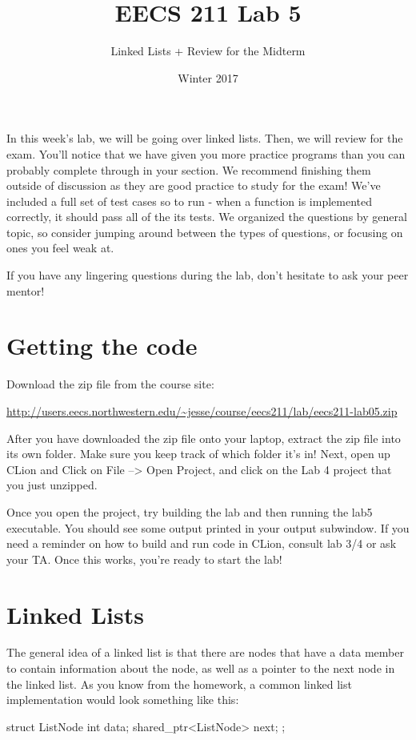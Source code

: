 \documentclass{tufte-handout}
\title{EECS 211 Lab 5}
\author{Linked Lists + Review for the Midterm}
\date{Winter 2017}
\begin{document}
\maketitle

In this week's lab, we will be going over linked lists. Then, we will review for the exam.
You'll notice that we have given you more practice programs than you can probably complete through in your section. We recommend finishing them outside of discussion as they are good practice to study for the exam! 
We've included a full set of test cases so to run - when a function is implemented correctly, it should pass all of the its tests.
We organized the questions by general topic, so consider jumping around between the types of questions, or focusing on ones you feel weak at.

If you have any lingering questions during the lab, don't hesitate to ask your peer mentor!
\section{Getting the code}
Download the zip file from the course site: \medskip

\url{http://users.eecs.northwestern.edu/~jesse/course/eecs211/lab/eecs211-lab05.zip}

\medskip \noindent
After you have downloaded the zip file onto your laptop, extract the zip file into its own folder. Make sure you keep track of which folder it's in!  Next, open up CLion and Click on File --> Open Project, and click on the Lab 4 project that you just unzipped. 

Once you open the project, try building the lab and then running the lab5 executable. 
You should see some output printed in your output subwindow.
If you need a reminder on how to build and run code in CLion, consult lab 3/4 or ask your TA.
Once this works, you're ready to start the lab!

\section{Linked Lists}
The general idea of a linked list is that there are nodes that have a data member to contain information about the node, as well as a pointer to the next node in the linked list.  
As you know from the homework, a common linked list implementation would look something like this:

\begin{Code}
struct ListNode{
    int data;
    shared_ptr<ListNode> next;
    };
\end{Code}
\end{document}
